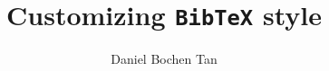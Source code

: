 \documentclass{article}
\title{Customizing \texttt{BibTeX} style}
\author{Daniel Bochen Tan}
\begin{document}
\maketitle

\cite{mypaper}
    


\end{document}
